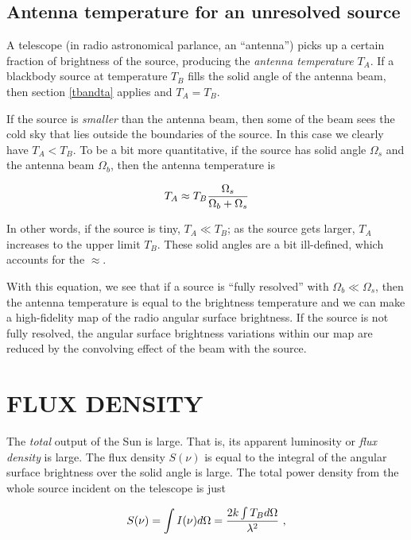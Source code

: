 \documentclass[psfig,preprint]{aastex}
\begin{document}
\subsection{Antenna temperature for an unresolved source}

	A telescope (in radio astronomical parlance, an ``antenna'')
picks up a certain fraction of brightness of the source, producing the
{\it antenna temperature} $T_A$.  If a blackbody source at temperature
$T_B$ fills the solid angle of the antenna beam, then  section
\ref{tbandta} applies and $T_A = T_B$. 

	If the source is {\it smaller} than the antenna beam, then some
of the beam sees the cold sky that lies outside the boundaries of the
source.  In this case we clearly have $T_A < T_B$.  To be a bit more
quantitative, if the source has solid angle $\Omega _s$ and the antenna
beam $\Omega _b$, then the antenna temperature is 

\begin{equation}
\label{eqfour}
T_A \approx T_B {\Omega _s \over \Omega _b + \Omega _s}
\end{equation}

\noindent In other words, if the source is tiny, $T_A \ll T_B$; as the
source gets larger, $T_A$ increases to the upper limit $T_B$.  These
solid angles are a bit ill-defined, which accounts for the $\approx$. 

	With this equation, we see that if a source is ``fully
resolved'' with $\Omega_b \ll \Omega_s$, then the antenna temperature is
equal to the brightness temperature and we can make a high-fidelity map
of the radio  angular surface brightness. If the source is not fully resolved,
the  angular surface brightness variations within our map are reduced by the
convolving effect of the beam with the source.

\section {FLUX DENSITY} \label{fluxdensity}

	The {\it total} output of the Sun is large. That is, its
apparent luminosity or {\it flux density} is large. The flux density
$S(\nu)$ is equal to the integral of the  angular surface brightness
over the solid angle is large.  The total power density from the whole
source  incident on the telescope is just

\begin{equation} 
\label{eqfive}
S(\nu) = \int I(\nu) d\Omega = {2 k \int T_B d\Omega
\over \lambda^2} \ ,
\end{equation}
\end{document}
